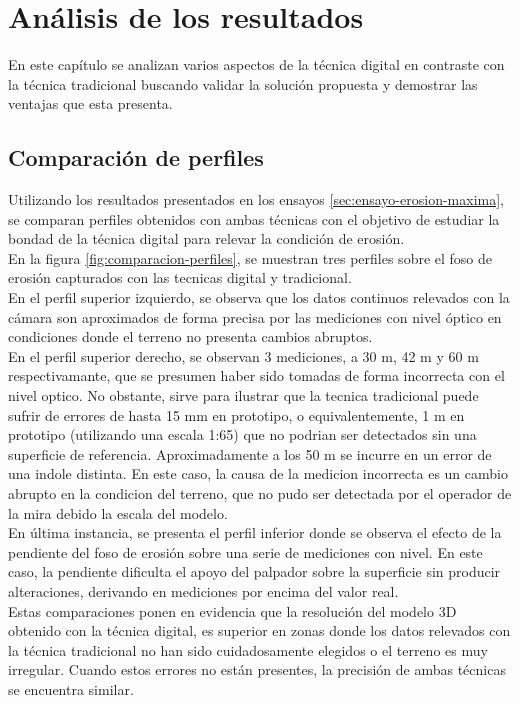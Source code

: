 \chapter{Análisis de los resultados}
En este capítulo se analizan varios aspectos de la técnica digital en contraste con la técnica tradicional buscando validar la solución propuesta y demostrar las ventajas que esta presenta.

\section{Comparación de perfiles}
Utilizando los resultados presentados en los ensayos \ref{sec:ensayo-erosion-maxima}, se comparan perfiles obtenidos con ambas técnicas con el objetivo de estudiar la bondad de la técnica digital para relevar la condición de erosión. \\
En la figura \ref{fig:comparacion-perfiles}, se muestran tres perfiles sobre el foso de erosión capturados con las tecnicas digital y tradicional. \\
En el perfil superior izquierdo, se observa que los datos continuos relevados con la cámara son aproximados de forma precisa por las mediciones con nivel óptico en condiciones donde el terreno no presenta cambios abruptos. \\
En el perfil superior derecho, se observan 3 mediciones, a 30 m, 42 m y 60 m respectivamante, que se presumen haber sido tomadas de forma incorrecta con el nivel optico. No obstante, sirve para ilustrar que la tecnica tradicional puede sufrir de errores de hasta 15 mm en prototipo, o equivalentemente, 1 m en prototipo (utilizando una escala 1:65) que no podrian ser detectados sin una superficie de referencia. Aproximadamente a los 50 m se incurre en un error de una indole distinta. En este caso, la causa de la medicion incorrecta es un cambio abrupto en la condicion del terreno, que no pudo ser detectada por el operador de la mira debido la escala del modelo. \\ 
En última instancia, se presenta el perfil inferior donde se observa el efecto de la pendiente del foso de erosión sobre una serie de mediciones con nivel. En este caso, la pendiente dificulta el apoyo del palpador sobre la superficie sin producir alteraciones, derivando en mediciones por encima del valor real. \\
Estas comparaciones ponen en evidencia que la resolución del modelo 3D obtenido con la técnica digital, es superior en zonas donde los datos relevados con la técnica tradicional no han sido cuidadosamente elegidos o el terreno es muy irregular. Cuando estos errores no están presentes, la precisión de ambas técnicas se encuentra similar.

